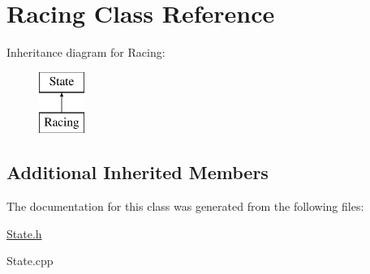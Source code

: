 \hypertarget{class_racing}{}\section{Racing Class Reference}
\label{class_racing}
Inheritance diagram for Racing\+:\begin{figure}[H]
\begin{center}
\leavevmode
\includegraphics[height=2.000000cm]{class_racing}
\end{center}
\end{figure}
\subsection*{Additional Inherited Members}


The documentation for this class was generated from the following files\+:\begin{DoxyCompactItemize}
\item 
\mbox{\hyperlink{_state_8h}{State.\+h}}\item 
State.\+cpp\end{DoxyCompactItemize}
